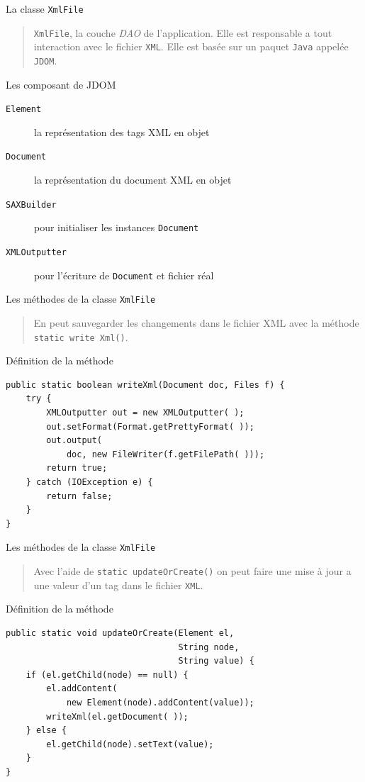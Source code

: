 \documentclass[captions=tableheading]{beamer}
\begin{document}
\begin{frame}[fragile,label={sec:orgb473447}]{La classe \texttt{XmlFile}}
 \begin{quote}
\texttt{XmlFile}, la couche \emph{DAO} de l'application. Elle est responsable a tout interaction avec le fichier \texttt{XML}. Elle est basée sur un paquet \texttt{Java} appelée \texttt{JDOM}.
\end{quote}

\begin{block}{Les composant de JDOM}
\begin{description}
\item[{\texttt{Element}}] la représentation des tags XML en objet
\item[{\texttt{Document}}] la représentation du document XML en objet
\item[{\texttt{SAXBuilder}}] pour initialiser les instances \texttt{Document}
\item[{\texttt{XMLOutputter}}] pour l'écriture de \texttt{Document} et fichier réal
\end{description}
\end{block}
\end{frame}
\begin{frame}[fragile,label={sec:org8ad45b9}]{Les méthodes de la classe \texttt{XmlFile}}
 \begin{quote}
En peut sauvegarder les changements dans le fichier XML avec la méthode \texttt{static write Xml()}.
\end{quote}

\begin{block}{Définition de la méthode}
\begin{verbatim}
public static boolean writeXml(Document doc, Files f) {
    try {
        XMLOutputter out = new XMLOutputter( );
        out.setFormat(Format.getPrettyFormat( ));
        out.output(
            doc, new FileWriter(f.getFilePath( )));
        return true;
    } catch (IOException e) {
        return false;
    }
}
\end{verbatim}
\end{block}
\end{frame}
\begin{frame}[fragile,label={sec:org7bd06e2}]{Les méthodes de la classe \texttt{XmlFile}}
 \begin{quote}
Avec l'aide de \texttt{static updateOrCreate()} on peut faire une mise à jour a une valeur d'un tag dans le fichier \texttt{XML}.
\end{quote}
\begin{block}{Définition de la méthode}
\begin{verbatim}
public static void updateOrCreate(Element el,
                                  String node,
                                  String value) {
    if (el.getChild(node) == null) {
        el.addContent(
            new Element(node).addContent(value));
        writeXml(el.getDocument( ));
    } else {
        el.getChild(node).setText(value);
    }
}
\end{verbatim}
\end{block}
\end{frame}
\end{document}
